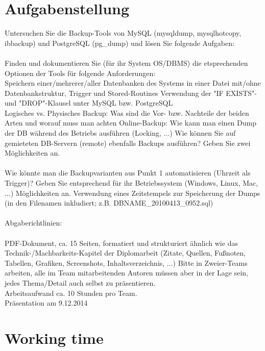 \documentclass[10pt]{article}
\begin{document}
\section{Aufgabenstellung}
Untersuchen Sie die Backup-Tools von MySQL (mysqldump, mysqlhotcopy, ibbackup) und PostgreSQL (pg\_dump) und lösen Sie folgende Aufgaben:
\\ \\
Finden und dokumentieren Sie (für ihr System OS/DBMS) die etsprechenden Optionen der Tools für folgende Anforderungen: \\
Speichern einer/mehrerer/aller Datenbanken des Systems in einer Datei mit/ohne Datenbankstruktur, Trigger und Stored-Routines 
Verwendung der "IF EXISTS"- und "DROP"-Klausel unter MySQL bzw. PostgreSQL \\
Logisches vs. Physisches Backup: Was sind die Vor- bzw. Nachteile der beiden Arten und worauf muss man achten
Online-Backup: Wie kann man einen Dump der DB während des Betriebs ausführen (Locking, ...)
Wie können Sie auf gemieteten DB-Servern (remote) ebenfalls Backups ausführen? Geben Sie zwei Möglichkeiten an.
\\ \\
Wie könnte man die Backupvarianten aus Punkt 1 automatisieren (Uhrzeit als Trigger)? Geben Sie entsprechend für ihr Betriebssystem (Windows, Linux, Mac, ...) Möglichkeiten an.
Verwendung eines Zeitstempels zur Speicherung der Dumps (in den Filenamen inkludiert; z.B. DBNAME\_20100413\_0952.sql)
\\ \\
Abgaberichtlinien:
 \\ \\
PDF-Dokument, ca. 15 Seiten, formatiert und strukturiert ähnlich wie das Technik-/Machbarkeits-Kapitel der Diplomarbeit (Zitate, Quellen, Fußnoten, Tabellen, Grafiken, Screenshots, Inhaltsverzeichnis, ...)
Bitte in Zweier-Teams arbeiten, alle im Team mitarbeitenden Autoren müssen aber in der Lage sein, jedes Thema/Detail auch selbst zu präsentieren. \\
Arbeitsaufwand ca. 10 Stunden pro Team.  \\
Präsentation am 9.12.2014

\section{Working time}
\end{document}
